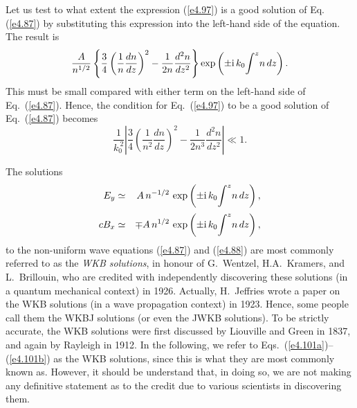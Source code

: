 Let us test to what extent  the expression (\ref{e4.97}) is a good solution 
of Eq. (\ref{e4.87}) by substituting this expression into the left-hand side
of the equation. The result is
\begin{equation}
\frac{A}{n^{1/2}}\left\{ \frac{3}{4}\left(\frac{1}{n}
\frac{dn}{dz}\right)^2 -\frac{1}{2n}\frac{d^2 n}{dz^2}\right\}
{\rm exp}\left( \pm {\rm i}\,k_0\!\int^z\!n\,dz\right).
\end{equation}
This must be small compared with either term on the left-hand side
of Eq.~(\ref{e4.87}). Hence, the
condition for Eq.~(\ref{e4.97}) to be a good solution of Eq.~(\ref{e4.87})
becomes
\begin{equation}\label{e4.100}
\frac{1}{k_0^{~2}}\left|  \frac{3}{4}\left(\frac{1}{n^2}
\frac{dn}{dz}\right)^2 -\frac{1}{2n^3}\frac{d^2 n}{dz^2}\right| \ll 1.
\end{equation}

The solutions
\begin{eqnarray}\label{e4.101a}
E_y &\simeq& A\,n^{-1/2}\,\exp\left(\pm {\rm i}\, k_0 \!\int^z \!n\,dz\right),\\[0.5ex]\label{e4.101b}
cB_x&\simeq& \mp A\, n^{1/2}\,\exp\left(\pm {\rm i}\,k_0\! \int^z\! n\,dz\right),
\end{eqnarray}
to the non-uniform wave equations (\ref{e4.87}) and (\ref{e4.88}) are most commonly
referred to as  the {\em WKB solutions},
in honour of G.~Wentzel, H.A.~Kramers, and L.~Brillouin, who are credited with
independently discovering these solutions
(in a quantum mechanical context) in 1926. Actually, H.~Jeffries wrote
a paper on the WKB solutions 
(in a wave propagation context) in 1923. Hence, some people call them the WKBJ
solutions (or even the JWKB solutions). To be strictly
accurate, the WKB solutions were 
first discussed
 by Liouville and Green in 1837, and again by Rayleigh in 1912. 
In the following, we  refer to Eqs.~(\ref{e4.101a})--(\ref{e4.101b})
as the WKB solutions, since this is what they are most commonly known as. However,
it should be understand that, in doing so, 
 we are not  making any  definitive statement as to the credit due
to various scientists in discovering them. 

